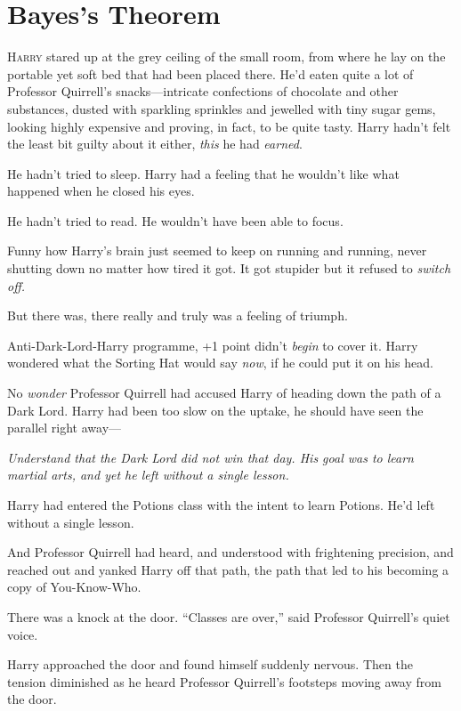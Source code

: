 \chapter{Bayes’s Theorem}

\lettrine{H}{arry} stared up at the grey ceiling of the small room, from where he lay on the portable yet soft bed that had been placed there. He’d eaten quite a lot of Professor Quirrell’s snacks—intricate confections of chocolate and other substances, dusted with sparkling sprinkles and jewelled with tiny sugar gems, looking highly expensive and proving, in fact, to be quite tasty. Harry hadn’t felt the least bit guilty about it either, \emph{this} he had \emph{earned}.

He hadn’t tried to sleep. Harry had a feeling that he wouldn’t like what happened when he closed his eyes.

He hadn’t tried to read. He wouldn’t have been able to focus.

Funny how Harry’s brain just seemed to keep on running and running, never shutting down no matter how tired it got. It got stupider but it refused to \emph{switch off.}

But there was, there really and truly was a feeling of triumph.

Anti-Dark-Lord-Harry programme, +1 point didn’t \emph{begin} to cover it. Harry wondered what the Sorting Hat would say \emph{now}, if he could put it on his head.

No \emph{wonder} Professor Quirrell had accused Harry of heading down the path of a Dark Lord. Harry had been too slow on the uptake, he should have seen the parallel right away—

\emph{Understand that the Dark Lord did not win that day. His goal was to learn martial arts, and yet he left without a single lesson.}

Harry had entered the Potions class with the intent to learn Potions. He’d left without a single lesson.

And Professor Quirrell had heard, and understood with frightening precision, and reached out and yanked Harry off that path, the path that led to his becoming a copy of You-Know-Who.

There was a knock at the door. “Classes are over,” said Professor Quirrell’s quiet voice.

Harry approached the door and found himself suddenly nervous. Then the tension diminished as he heard Professor Quirrell’s footsteps moving away from the door.

